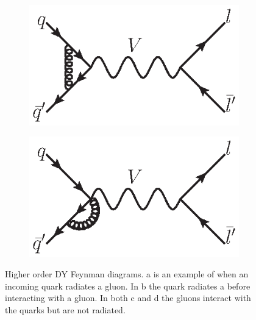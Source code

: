 \begin{figure}[!p]
\begin{subfigure}[b]{\SideBySidePlotWidth}
        \includegraphics[width=\linewidth]{figures/TheoryFigures/VectorBosonQToLeptonqgexchange.eps}
        \caption{}
        \label{fig:feyn_DYloops}
    \end{subfigure}%
    \begin{subfigure}[b]{\SideBySidePlotWidth}
        \includegraphics[width=\linewidth]{figures/TheoryFigures/VectorBosonQToLeptonqLoop.eps}
        \caption{}
        \label{fig:feyn_DYmoreloops}
    \end{subfigure}%

    \caption[
        Higher order DY Feynman diagrams.
    ]{
        Higher order DY Feynman diagrams. a is an example of when an incoming quark radiates a gluon. In b the quark radiates a \Z before interacting with a gluon. In both c and d the gluons interact with the quarks but are not radiated.
    }
    \label{fig:higher_order_z_diagrams}
\end{figure}